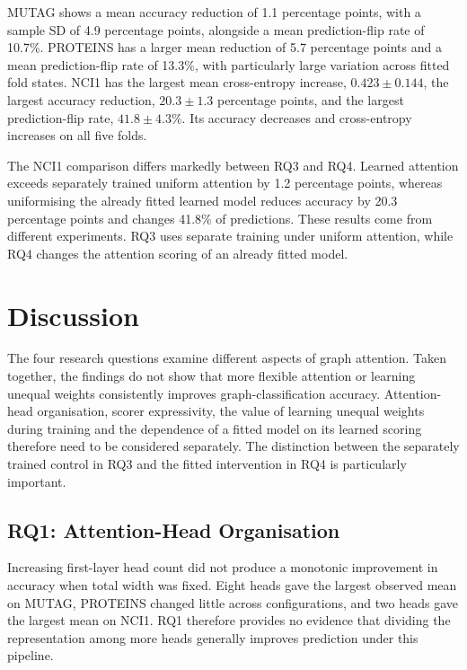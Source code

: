 \documentclass[11pt,a4paper]{article}
\begin{document}
MUTAG shows a mean accuracy reduction of 1.1 percentage points, with a sample SD of 4.9 percentage points, alongside a mean prediction-flip rate of 10.7\%. PROTEINS has a larger mean reduction of 5.7 percentage points and a mean prediction-flip rate of 13.3\%, with particularly large variation across fitted fold states. NCI1 has the largest mean cross-entropy increase, \(0.423\pm0.144\), the largest accuracy reduction, \(20.3\pm1.3\) percentage points, and the largest prediction-flip rate, \(41.8\pm4.3\%\). Its accuracy decreases and cross-entropy increases on all five folds.

The NCI1 comparison differs markedly between RQ3 and RQ4. Learned attention exceeds separately trained uniform attention by 1.2 percentage points, whereas uniformising the already fitted learned model reduces accuracy by 20.3 percentage points and changes 41.8\% of predictions. These results come from different experiments. RQ3 uses separate training under uniform attention, while RQ4 changes the attention scoring of an already fitted model.





\clearpage
\section{Discussion}
\label{sec:discussion}

The four research questions examine different aspects of graph attention. Taken together, the findings do not show that more flexible attention or learning unequal weights consistently improves graph-classification accuracy. Attention-head organisation, scorer expressivity, the value of learning unequal weights during training and the dependence of a fitted model on its learned scoring therefore need to be considered separately. The distinction between the separately trained control in RQ3 and the fitted intervention in RQ4 is particularly important.

\subsection{RQ1: Attention-Head Organisation}
\label{sec:discussion-rq1}

Increasing first-layer head count did not produce a monotonic improvement in accuracy when total width was fixed. Eight heads gave the largest observed mean on MUTAG, PROTEINS changed little across configurations, and two heads gave the largest mean on NCI1. RQ1 therefore provides no evidence that dividing the representation among more heads generally improves prediction under this pipeline.
\end{document}
